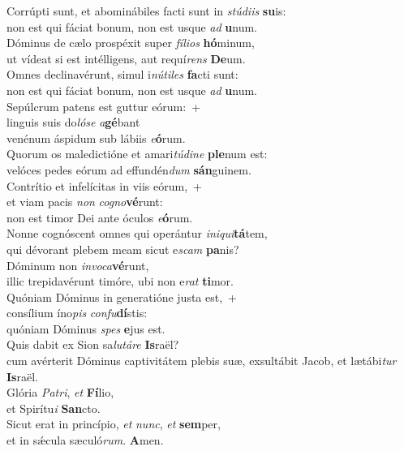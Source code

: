 \evenverse Corrúpti sunt, et abominábiles facti sunt in \textit{stú}\textit{di}\textit{is} \textbf{su}is:~\*\\
\evenverse non est qui fáciat bonum, non est usque \textit{ad} \textbf{u}num.\\
\oddverse Dóminus de cælo prospéxit super \textit{fí}\textit{li}\textit{os} \textbf{hó}minum,~\*\\
\oddverse ut vídeat si est intélligens, aut requí\textit{rens} \textbf{De}um.\\
\evenverse Omnes declinavérunt, simul i\textit{nú}\textit{ti}\textit{les} \textbf{fa}cti sunt:~\*\\
\evenverse non est qui fáciat bonum, non est usque \textit{ad} \textbf{u}num.\\
\oddverse Sepúlcrum patens est guttur eórum:~+\\
\oddverse  linguis suis do\textit{ló}\textit{se} \textit{a}\textbf{gé}bant~\*\\
\oddverse venénum áspidum sub lábiis \textit{e}\textbf{ó}rum.\\
\evenverse Quorum os maledictióne et amari\textit{tú}\textit{di}\textit{ne} \textbf{ple}num est:~\*\\
\evenverse velóces pedes eórum ad effundén\textit{dum} \textbf{sán}guinem.\\
\oddverse Contrítio et infelícitas in viis eórum,~+\\
\oddverse  et viam pacis \textit{non} \textit{co}\textit{gno}\textbf{vé}runt:~\*\\
\oddverse non est timor Dei ante óculos \textit{e}\textbf{ó}rum.\\
\evenverse Nonne cognóscent omnes qui operántur \textit{i}\textit{ni}\textit{qui}\textbf{tá}tem,~\*\\
\evenverse qui dévorant plebem meam sicut e\textit{scam} \textbf{pa}nis?\\
\oddverse Dóminum non \textit{in}\textit{vo}\textit{ca}\textbf{vé}runt,~\*\\
\oddverse illic trepidavérunt timóre, ubi non e\textit{rat} \textbf{ti}mor.\\
\evenverse Quóniam Dóminus in generatióne justa est,~+\\
\evenverse  consílium íno\textit{pis} \textit{con}\textit{fu}\textbf{dí}stis:~\*\\
\evenverse quóniam Dóminus \textit{spes} \textbf{e}jus est.\\
\oddverse Quis dabit ex Sion sa\textit{lu}\textit{tá}\textit{re} \textbf{Is}raël?~\*\\
\oddverse cum avérterit Dóminus captivitátem plebis suæ, exsultábit Jacob, et lætábi\textit{tur} \textbf{Is}raël.\\
\evenverse Glória \textit{Pa}\textit{tri}, \textit{et} \textbf{Fí}lio,~\*\\
\evenverse et Spirítu\textit{i} \textbf{San}cto.\\
\oddverse Sicut erat in princípio, \textit{et} \textit{nunc}, \textit{et} \textbf{sem}per,~\*\\
\oddverse et in sǽcula sæculó\textit{rum}. \textbf{A}men.\\
